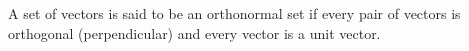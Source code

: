 A set of vectors is said to be an orthonormal set if every pair
of vectors is orthogonal (perpendicular) and every vector is a unit vector.